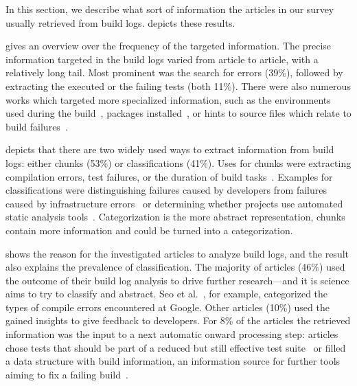 In this section, we describe what sort of information the articles in
our survey usually retrieved from build logs.
 depicts these results.

 gives an overview over the frequency of
the targeted information.
The precise information targeted in the build logs varied from article
to article, with a relatively long tail.
Most prominent was the search for errors (39\%), followed by extracting
the executed or the failing
tests (both 11\%).
There were also numerous works which targeted more specialized
information, such as the environments used during the
build~\cite{zolfagharinia2017not}, packages
installed~\cite{selberg2012use}, or hints to source files which
relate to build failures~\cite{ren2018automated}.

 depicts that there are two widely used ways to
extract information from build logs: either chunks (53\%) or
classifications (41\%).
Uses for chunks were extracting compilation errors,
test failures, or the duration of build
tasks~\cite{clemencic2014new,zhang2016android}.
Examples for
classifications were distinguishing failures caused by developers from
failures caused by infrastructure errors~\cite{lindqvist2019detection}
or determining whether projects use automated static analysis
tools~\cite{kavaler2019tool}.
Categorization is the more abstract representation, chunks
contain more information and could be turned into a categorization.

 shows the reason for the
investigated articles to analyze build logs, and the result also explains
the prevalence of classification.
The majority of articles (46\%) used the outcome of their build log
analysis to drive further research---and it is science aims to try to
classify and abstract.
Seo et al.~\cite{seo2014programmers}, for example,
categorized the types of compile errors encountered at
Google.
Other articles (10\%) used the gained insights to give feedback to
developers.
For 8\% of the articles the retrieved information was the input
to a next automatic onward processing step:
articles chose
tests that should be part of a reduced but still effective test
suite~\cite{shi2018evaluating} or filled a data structure with
build information, an information source for further tools aiming
to fix a failing build~\cite{vassallo2018un-break}.

